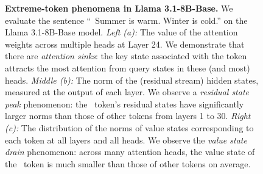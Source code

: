 \begin{figure}[t]
  \vspace{-2em}
  \caption{\small \textbf{Extreme-token phenomena in Llama 3.1-8B-Base.}
  We evaluate the sentence ``\bos~Summer is warm. Winter is cold.'' on the Llama 3.1-8B-Base model. \textit{Left (a):} The value of the attention weights across multiple heads at Layer 24. We demonstrate that there are \textit{attention sinks}: the key state associated with the \bos{} token attracts the most attention from query states in these (and most) heads. 
  \textit{Middle (b):} The norm of the (residual stream) hidden states, measured at the output of each layer. We observe a \textit{residual state peak} phenomenon: the \bos~token's residual states have significantly larger norms than those of other tokens from layers 1 to 30. 
  \textit{Right (c):} The distribution of the norms of value states corresponding to each token at all layers 
  and all heads. We observe the \textit{value state drain} phenomenon: across many attention heads, the value state of the \bos~token is much smaller than those of other tokens on average. %
  }
  \label{figure:extreme-token}
  \vspace{-1em}
\end{figure}



